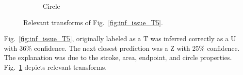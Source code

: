 \documentclass[conference]{IEEEtran}
\begin{document}
\begin{figure}[h]
\begin{subfigure}{.20\columnwidth}
        \caption{Circle}
    \end{subfigure}%
    \caption{Relevant transforms of Fig.~\ref{fig:inf_issue_T5}.}
    \label{fig:t5_trans}
\end{figure}

Fig.~\ref{fig:inf_issue_T5}, originally labeled as a T was inferred correctly as
a U with 36\% confidence. The next closest prediction was a Z with 25\%
confidence.  The explanation was due to the stroke, area,
endpoint, and circle properties. Fig.~\ref{fig:t5_trans}
depicts relevant transforms.
\end{document}
